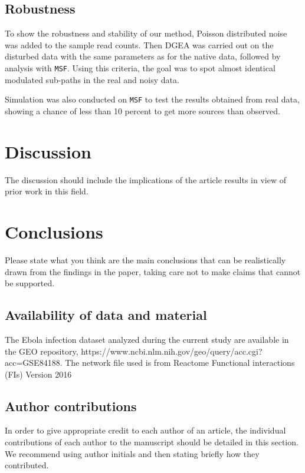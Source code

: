 \documentclass[twocolumn]{article}
\begin{document}
\subsection*{Robustness}

To show the robustness and stability of our method, Poisson
distributed noise was added to the sample read counts. 
Then DGEA was carried out on the disturbed data with the
same parameters as for the native data, followed by analysis with
\texttt{MSF}. Using this criteria, the goal was to spot almost
identical modulated sub-paths in the real and noisy data. 


Simulation was also conducted on \texttt{MSF} to test the results
obtained from real data, showing a chance of less than 10 percent to
get more sources than observed.



\section*{Discussion}

The discussion should include the implications of the article results
in view of prior work in this field.

\section*{Conclusions}

Please state what you think are the main conclusions that can be
realistically drawn from the findings in the paper, taking care not to
make claims that cannot be supported.

\subsection*{Availability of data and material}

The Ebola infection dataset analyzed during the current study are
available in the GEO repository, {\scriptsize
  https://www.ncbi.nlm.nih.gov/geo/query/acc.cgi?acc=GSE84188.}  The
network file used is from Reactome Functional interactions (FIs)
Version 2016


\subsection*{Author contributions}
In order to give appropriate credit to each author of an article, the individual
contributions of each author to the manuscript should be detailed in this section. We
recommend using author initials and then stating briefly how they contributed.
\end{document}
